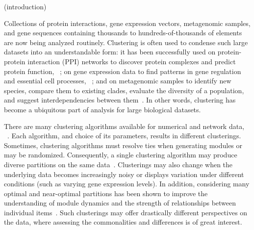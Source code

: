\documentclass[12pt]{cmuthesis}
\begin{document}
  (introduction)

  Collections of protein interactions, gene expression vectors, metagenomic
  samples, and gene sequences containing thousands to hundreds-of-thousands of
  elements are now being analyzed routinely. Clustering is often used to condense
  such large datasets into an understandable form: it has been successfully used
  on protein-protein interaction (PPI) networks to discover protein complexes and
  predict protein function, \eg~\cite{Sharan2007}; on gene expression data to find
  patterns in gene regulation and essential cell processes, \eg~\cite{Ulitsky2010};
  and on metagenomic samples to identify new species, compare them to existing
  clades, evaluate the diversity of a population, and suggest interdependencies
  between them~\cite{Chatterji2007, White2010}. In other words, clustering has
  become a ubiquitous part of analysis for large biological datasets.


  There are many clustering algorithms available for numerical and network data,
  \eg~\cite{VanDongen2000, Bader2003, Clauset2004, Adamcsek2006, Blondel2008,
  Ahn2010, Jiang2010, Rhrissorrakrai2011}. Each algorithm, and choice of its
  parameters, results in different clusterings.
  Sometimes, clustering algorithms must resolve ties when generating modules or
  may be randomized. Consequently, a single clustering algorithm may produce
  diverse partitions on the same data~\cite{Navlakha10}. Clusterings may also
  change when the underlying data becomes increasingly noisy or displays
  variation under different conditions (such as varying gene expression levels).
  In addition, considering many optimal and
  near-optimal partitions has been shown to improve the understanding of module
  dynamics and the strength of relationships between individual
  items~\cite{Duggal2010, Lewis2010, Langfelder2008, Hopcroft2004}. Such
  clusterings may offer drastically different perspectives on the data, where
  assessing the commonalities and differences is of great interest.

\end{document}
